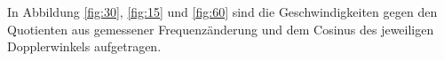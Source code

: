 \noindent In Abbildung \ref{fig:30}, \ref{fig:15} und \ref{fig:60} sind die Geschwindigkeiten gegen den Quotienten aus gemessener Frequenzänderung und dem Cosinus des jeweiligen
Dopplerwinkels aufgetragen.


